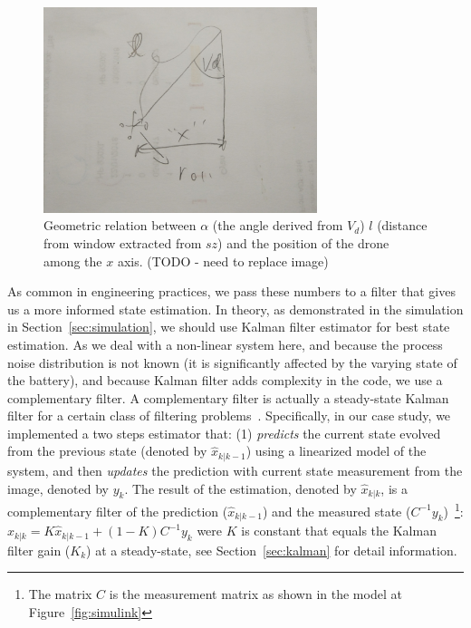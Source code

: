 \documentclass[ twoside, 12pt ]{article}
\begin{document}
\begin{figure} %
    \centerline{\includegraphics[width=80mm]{vd-geometry.jpg}}
    \caption{Geometric relation between $\alpha$ (the angle derived from $V_d$) $l$ (distance from window extracted from $sz$) and the position of the drone among the $x$ axis. (TODO - need to replace image)}
    \label{fig:V_d-geomerty}
\end{figure}

As common in engineering practices, we pass these numbers to a filter that gives us a more informed state estimation. 
In theory, as demonstrated in the simulation in Section~\ref{sec:simulation}, we should use Kalman filter estimator for best state estimation. As we deal with a non-linear system here, and because the process noise distribution is not known (it is significantly affected by the varying state of the battery), and because Kalman filter adds complexity in the code, we use a complementary filter.
A complementary filter is actually a steady-state Kalman filter for a certain class of filtering problems~\cite{complementaryVSKalman}.
Specifically, in our case study, we implemented a two steps estimator that: (1) \textit{predicts} the current state evolved from the previous state (denoted by $\hat{x}_{k|k-1}$) using a linearized model of the system, and then \textit{updates} the prediction with current state measurement from the image, denoted by $y_k$.
The result of the estimation, denoted by $\hat{x}_{k|k}$, is a complementary filter of the prediction ($\hat{x}_{k|k-1}$) and the measured state ($C^{-1}y_k$)~\footnote{The matrix $C$ is the measurement matrix as shown in the model at Figure~\ref{fig:simulink}}:
$ \hat{x}_{k|k} = K \hat{x}_{k|k-1} + (1-K) C^{-1}y_k $ were $K$ is constant that equals the Kalman filter gain ($K_k$) at a steady-state, see Section~\ref{sec:kalman} for detail information.
\end{document}
